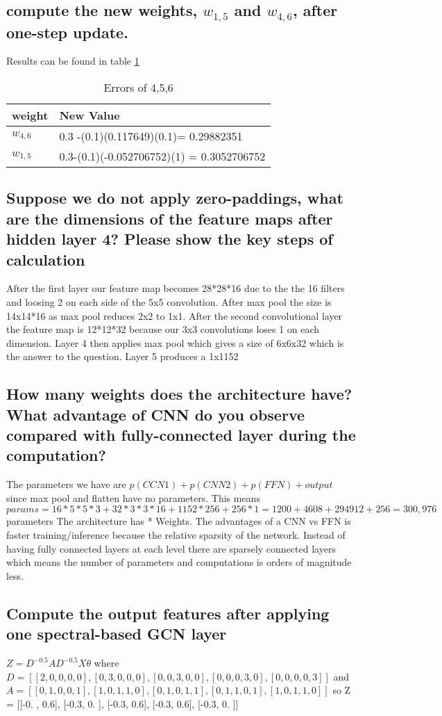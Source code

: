 \documentclass[11pt]{article}
\begin{document}
\subsection{compute the new weights, $w_{1,5}$ and $w_{4,6}$, after one-step update.}
Results can be found in table \ref{tab:newweight}
\begin{table}[]
\begin{tabular}{|l|l|} \hline
weight & New Value \\ \hline
$w_{4,6}$ & 0.3 -(0.1)(0.117649)(0.1)= 0.29882351\\ \hline 
$w_{1,5}$ & 0.3-(0.1)(-0.052706752)(1) = 0.3052706752 \\ \hline
\end{tabular}
\caption{Errors of  4,5,6}
\label{tab:newweight}
\end{table}
\subsection{Suppose we do not apply zero-paddings, what are the dimensions of the feature maps after hidden layer 4? Please show the key steps of calculation}
After the first layer our feature map becomes 28*28*16 due to the the 16 filters and loosing 2 on each side of the 5x5 convolution. After max pool the size is 14x14*16 as max pool reduces 2x2 to 1x1. After the second convolutional layer the feature map is 12*12*32 because our 3x3 convolutions loses 1 on each dimension. Layer 4 then applies max pool which gives a size of 6x6x32 which is the answer to the question. Layer 5 produces a 1x1152
\subsection{How many weights does the architecture have? What advantage of CNN do you observe compared with fully-connected layer during the computation?}
The parameters we have are $p(CCN1) + p(CNN2) +p(FFN) + output$ since max pool and flatten have no parameters. This means $params = 16*5*5*3+32*3*3*16+1152*256+256*1= 1200+4608+294912+256 = 300,976$ parameters
The architecture has * Weights. The advantages of a CNN vs FFN is faster training/inference because the relative sparsity of the network. Instead of having fully connected layers at each level there are sparsely connected layers which means the number of parameters and computations is orders of magnitude less.
\subsection{ Compute the output features after applying one spectral-based GCN layer}
$Z = D^{-0.5}AD^{-0.5}X\theta$ where $D = [[2,0,0,0,0],[0,3,0,0,0],[0,0,3,0,0],[0,0,0,3,0],[0,0,0,0,3]]$ and $A=[[0,1,0,0,1],[1,0,1,1,0],[0,1,0,1,1],[0,1,1,0,1],[1,0,1,1,0]]$ so Z = [[-0. ,  0.6],
       [-0.3,  0. ],
       [-0.3,  0.6],
       [-0.3,  0.6],
       [-0.3,  0. ]]
\end{document}
